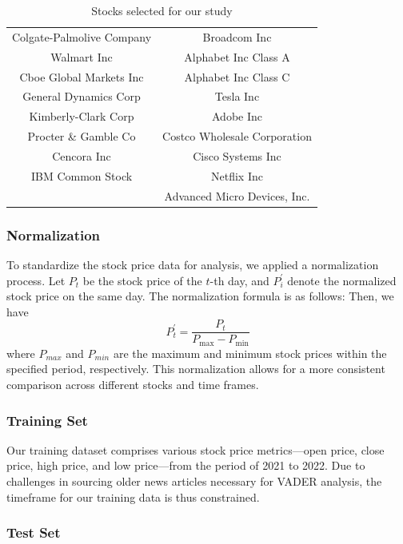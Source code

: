 \begin{table}[h]
\begin{tabular}{cc}
	Colgate-Palmolive Company		&	Broadcom Inc										\\
	Walmart Inc						&	Alphabet Inc Class A								\\
	Cboe Global Markets Inc			&	Alphabet Inc Class C								\\
	General Dynamics Corp			&	Tesla Inc											\\
	Kimberly-Clark Corp				&	Adobe Inc											\\
	Procter \& Gamble Co			&	Costco Wholesale Corporation						\\
	Cencora Inc						&	Cisco Systems Inc									\\
	IBM Common Stock				&	Netflix Inc											\\
									&	Advanced Micro Devices, Inc.						\\
	\bottomrule
	\end{tabular}
	\caption{Stocks selected for our study}
\end{table}

\subsubsection{Normalization}

To standardize the stock price data for analysis, we applied a normalization process. Let $P_{t}$ be the stock price of the $t$-th day, and $P_{i}^{\prime}$ denote the normalized stock price on the same day. The normalization formula is as follows:
Then, we have
\begin{equation}
	P_{t}^{\prime} = \frac{P_{t}}{P_{\max} - P_{\min}}
\end{equation}
where $P_{max}$ and $P_{min}$ are the maximum and minimum stock prices within the specified period, respectively. This normalization allows for a more consistent comparison across different stocks and time frames.

\subsubsection{Training Set}

Our training dataset comprises various stock price metrics—open price, close price, high price, and low price—from the period of 2021 to 2022. 
Due to challenges in sourcing older news articles necessary for VADER analysis, the timeframe for our training data is thus constrained.

\subsubsection{Test Set}

